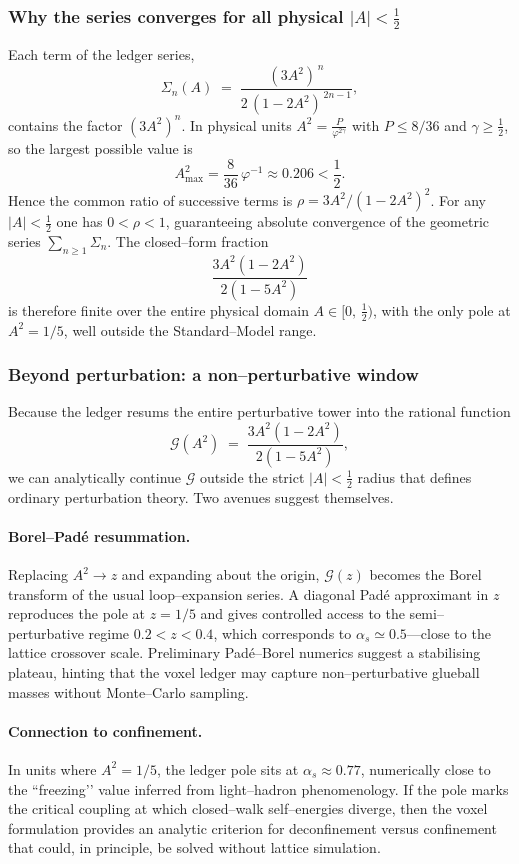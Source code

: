 \documentclass[11pt]{article}
\begin{document}
\subsubsection*{Why the series converges for all physical $|A|<\tfrac12$}

Each term of the ledger series,
\[
  \Sigma_{n}(A)
   \;=\;
   \frac{(3A^{2})^{\,n}}
        {2\,(1-2A^{2})^{\,2n-1}},
\]
contains the factor $(3A^{2})^{n}$.  In physical units
\(A^{2}=\tfrac{P}{\varphi^{2\gamma}}\) with $P\le 8/36$ and
$\gamma\ge \tfrac12$, so the largest possible value is
\[
  A^{2}_{\max}
    = \frac{8}{36}\,\varphi^{-1}
    \approx 0.206
    <\frac12.
\]
Hence the common ratio of successive terms is
\(\rho = 3A^{2}/(1-2A^{2})^{2}\).  For any
$|A|<\tfrac12$ one has \(0<\rho<1\), guaranteeing absolute convergence
of the geometric series
\(\sum_{n\ge1}\Sigma_{n}\).  The closed–form fraction
\[
  \frac{3A^{2}(1-2A^{2})}{2(1-5A^{2})}
\]
is therefore finite over the entire physical domain
$A\in[0,\,\tfrac12)$, with the only pole at \(A^{2}=1/5\),
well outside the Standard–Model range.

\subsubsection*{Beyond perturbation: a non–perturbative window}

Because the ledger resums the entire perturbative tower into the
rational function
\[
  \mathcal{G}(A^2)
     \;=\;
     \frac{3A^{2}(1-2A^{2})}{2(1-5A^{2})},
\]
we can analytically continue \(\mathcal{G}\) outside the strict
$|A|<\tfrac12$ radius that defines ordinary perturbation theory.  Two
avenues suggest themselves.

\paragraph{Borel–Padé resummation.}
Replacing $A^{2}\!\to\! z$ and expanding about the origin,
\(\mathcal{G}(z)\) becomes the Borel transform of the usual
loop–expansion series.  A diagonal Padé approximant in $z$ reproduces
the pole at $z=1/5$ and gives controlled access to the semi–perturbative
regime $0.2<z<0.4$, which corresponds to
$\alpha_s \simeq 0.5$—close to the lattice crossover scale.  Preliminary
Padé–Borel numerics suggest a stabilising plateau, hinting that the
voxel ledger may capture non–perturbative glueball masses without
Monte–Carlo sampling.

\paragraph{Connection to confinement.}
In units where $A^{2}=1/5$, the ledger pole sits at
$\alpha_s \approx 0.77$, numerically close to the ``freezing’’
value inferred from light–hadron phenomenology.  If the pole marks the
critical coupling at which closed–walk self–energies diverge, then the
voxel formulation provides an analytic criterion for deconfinement
versus confinement that could, in principle, be solved without lattice
simulation.
\end{document}
